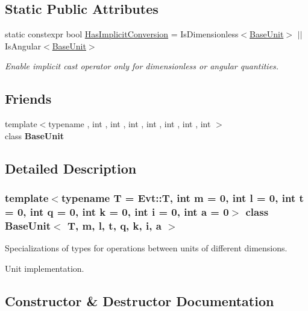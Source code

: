 \subsection*{Static Public Attributes}
\begin{DoxyCompactItemize}
\item 
\hypertarget{classBaseUnit_ab5dbf8f24dd6f304d444936443ab1ca6}{}\label{classBaseUnit_ab5dbf8f24dd6f304d444936443ab1ca6} 
static constexpr bool \hyperlink{classBaseUnit_ab5dbf8f24dd6f304d444936443ab1ca6}{Has\+Implicit\+Conversion} = Is\+Dimensionless$<$\hyperlink{classBaseUnit}{Base\+Unit}$>$ $\vert$$\vert$ Is\+Angular$<$\hyperlink{classBaseUnit}{Base\+Unit}$>$
\begin{DoxyCompactList}\small\item\em Enable implicit cast operator only for dimensionless or angular quantities. \end{DoxyCompactList}\end{DoxyCompactItemize}
\subsection*{Friends}
\begin{DoxyCompactItemize}
\item 
\hypertarget{classBaseUnit_a3d586472b07d8c8652e151e44d21ff4a}{}\label{classBaseUnit_a3d586472b07d8c8652e151e44d21ff4a} 
{\footnotesize template$<$typename , int , int , int , int , int , int , int $>$ }\\class {\bfseries Base\+Unit}
\end{DoxyCompactItemize}


\subsection{Detailed Description}
\subsubsection*{template$<$typename T = Evt\+::T, int m = 0, int l = 0, int t = 0, int q = 0, int k = 0, int i = 0, int a = 0$>$\newline
class Base\+Unit$<$ T, m, l, t, q, k, i, a $>$}

Specializations of types for operations between units of different dimensions. 

Unit implementation. 

\subsection{Constructor \& Destructor Documentation}
\hypertarget{classBaseUnit_aed70e2462e9f56a37b56ffa3bae498dd}{}\label{classBaseUnit_aed70e2462e9f56a37b56ffa3bae498dd} 
